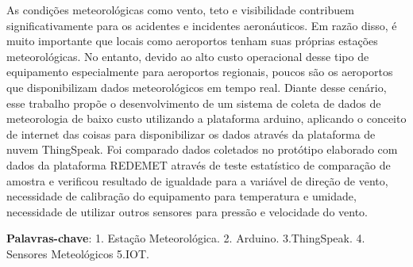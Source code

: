 
\setlength{\absparsep}{18pt} %
\begin{resumo}
As condições meteorológicas como vento, teto e visibilidade contribuem significativamente para os acidentes e incidentes aeronáuticos. Em razão disso, é muito importante que locais como aeroportos tenham suas próprias estações meteorológicas. No entanto, devido ao alto custo operacional desse tipo de equipamento especialmente para aeroportos regionais, poucos são os aeroportos que disponibilizam dados meteorológicos em tempo real. Diante desse cenário, esse trabalho propõe o desenvolvimento de um sistema de coleta de dados de meteorologia de baixo custo utilizando a plataforma arduino, aplicando o conceito de internet das coisas para disponibilizar os dados através da plataforma de nuvem ThingSpeak. Foi comparado dados coletados no protótipo elaborado com dados da plataforma REDEMET através de teste estatístico de comparação de amostra e verificou resultado de igualdade para a variável de direção de vento, necessidade de calibração do equipamento para temperatura e umidade, necessidade de utilizar outros sensores para pressão e velocidade do vento.


 \vspace{\onelineskip}
 \noindent
 \textbf{Palavras-chave}: 1. Estação Meteorológica. 2. Arduino. 3.ThingSpeak. 4. Sensores Meteológicos 5.IOT.

\end{resumo}

